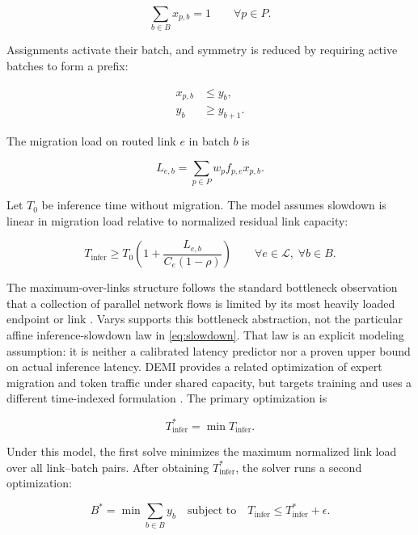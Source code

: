\begin{equation}
  \sum_{b\in B}x_{p,b}=1 \qquad \forall p\in P.
  \label{eq:flow-once}
\end{equation}

Assignments activate their batch, and symmetry is reduced by requiring active
batches to form a prefix:

\begin{align}
  x_{p,b} &\leq y_b,\\
  y_b &\geq y_{b+1}.
\end{align}

The migration load on routed link $e$ in batch $b$ is

\begin{equation}
  L_{e,b}=\sum_{p\in P}w_p f_{p,e}x_{p,b}.
  \label{eq:link-load}
\end{equation}

Let $T_0$ be inference time without migration. The model assumes slowdown is
linear in migration load relative to normalized residual link capacity:

\begin{equation}
  T_{\mathrm{infer}} \geq
  T_0\left(1+\frac{L_{e,b}}{C_e(1-\rho)}\right)
  \qquad \forall e\in\mathcal{L},\;\forall b\in B.
  \label{eq:slowdown}
\end{equation}

The maximum-over-links structure follows the standard bottleneck observation
that a collection of parallel network flows is limited by its most heavily
loaded endpoint or link \cite{chowdhury2014varys}. Varys supports this bottleneck
abstraction, not the particular affine inference-slowdown law in
\cref{eq:slowdown}. That law is an explicit modeling assumption: it is neither
a calibrated latency predictor nor a proven upper bound on actual inference
latency. DEMI provides a related optimization of expert migration and token
traffic under shared capacity, but targets training and uses a different
time-indexed formulation \cite{zhang2025demi}. The primary optimization is

\begin{equation}
  T_{\mathrm{infer}}^*=\min T_{\mathrm{infer}}.
  \label{eq:primary-objective}
\end{equation}

Under this model, the first solve minimizes the maximum normalized link load
over all link--batch pairs. After obtaining $T_{\mathrm{infer}}^*$, the solver
runs a second optimization:

\begin{equation}
  B^*=\min\sum_{b\in B}y_b
  \quad\text{subject to}\quad
  T_{\mathrm{infer}}\leq T_{\mathrm{infer}}^*+\epsilon.
  \label{eq:secondary-objective}
\end{equation}

